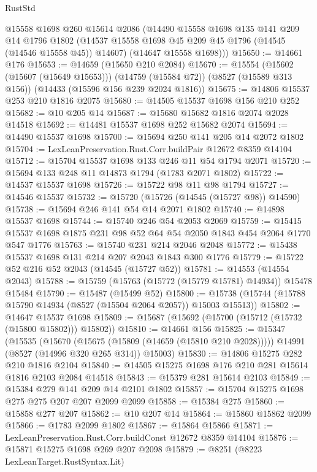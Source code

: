 \begin{lexlean}{RustStd}
\begin{coremodule}
      @15558
      @1698
      @260
      @15614
      @2086
      (@14490
        @15558
        @1698
        @135
        @141
        @209
        @14
        @1796
        @1802
        (@14537 @15558 @1698 @45 @209 @45 @1796 (@14545 (@14546 @15558 @45)) @14607)
        (@14647 @15558 @1698)))
@15650 := @14661 @176
@15653 := @14659 (@15650 @210 @2084)
@15670 := @15554
    (@15602 (@15607 (@15649 @15653)))
    (@14759 (@15584 @72))
    (@8527 (@15589 @313 @156))
    (@14433 (@15596 @156 @239 @2024 @1816))
@15675 := @14806 @15537 @253 @210 @1816 @2075
@15680 := @14505 @15537 @1698 @156 @210 @252
@15682 := @10 @205 @14
@15687 := @15680 @15682 @1816 @2074 @2028 @14518
@15692 := @14481 @15537 @1698 @252 @15682 @2074
@15694 := @14490 @15537 @1698
@15700 := @15694 @250 @141 @205 @14 @2072 @1802
@15704 := LexLeanPreservation.Rust.Corr.buildPair @12672 @8359 @14104
@15712 := @15704 @15537 @1698 @133 @246 @11 @54 @1794 @2071
@15720 := @15694 @133 @248 @11 @14873 @1794 (@1783 @2071 @1802)
@15722 := @14537 @15537 @1698
@15726 := @15722 @98 @11 @98 @1794
@15727 := @14546 @15537
@15732 := @15720 (@15726 (@14545 (@15727 @98)) @14590)
@15738 := @15694 @246 @141 @54 @14 @2071 @1802
@15740 := @14898 @15537 @1698
@15744 := @15740 @246 @54 @2053 @2069
@15759 := @15415 @15537 @1698 @1875 @231 @98 @52 @64 @54 @2050 @1843 @454 @2064 @1770 @547 @1776
@15763 := @15740 @231 @214 @2046 @2048
@15772 := @15438 @15537 @1698 @131 @214 @207 @2043 @1843 @300 @1776
@15779 := @15722 @52 @216 @52 @2043 (@14545 (@15727 @52))
@15781 := @14553 (@14554 @2043)
@15788 := @15759 (@15763 (@15772 (@15779 @15781) @14934)) @15478 @15484
@15790 := @15487 (@15499 @52)
@15800 := @15738 (@15744 (@15788 @15790 @14934 (@8527 (@15504 @2064 @2057)) @15003 @15513))
@15802 := @14647 @15537 @1698
@15809 := @15687 (@15692 (@15700 (@15712 (@15732 (@15800 @15802))) @15802))
@15810 := @14661 @156
@15825 := @15347
    (@15535
      (@15670 (@15675 (@15809 (@14659 (@15810 @210 @2028)))))
      @14991
      (@8527 (@14996 @320 @265 @314))
      @15003)
@15830 := @14806 @15275 @282 @210 @1816 @2104
@15840 := @14505 @15275 @1698 @176 @210 @281 @15614 @1816 @2103 @2084 @14518
@15843 := @15379 @281 @15614 @2103
@15849 := @15384 @279 @141 @209 @14 @2101 @1802
@15857 := @15704 @15275 @1698 @275 @275 @207 @207 @2099 @2099
@15858 := @15384 @275
@15860 := @15858 @277 @207
@15862 := @10 @207 @14
@15864 := @15860 @15862 @2099
@15866 := @1783 @2099 @1802
@15867 := @15864 @15866
@15871 := LexLeanPreservation.Rust.Corr.buildConst @12672 @8359 @14104
@15876 := @15871 @15275 @1698 @269 @207 @2098
@15879 := @8251 (@8223 LexLeanTarget.RustSyntax.Lit)

\end{coremodule}
\end{lexlean}
